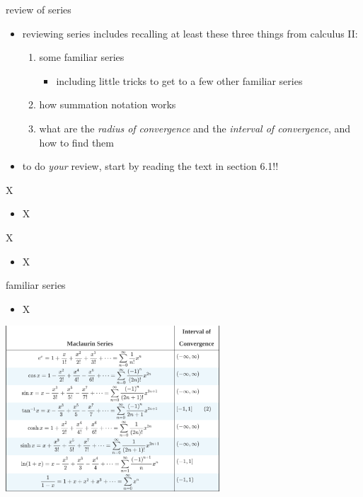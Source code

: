 \documentclass[urlcolor=blue,dvipsnames]{beamer}
\begin{document}
\begin{frame}{review of series}

\begin{itemize}
\item reviewing series includes recalling at least these three things from calculus II:
    \begin{enumerate}
    \item some familiar series
        \begin{itemize}
        \item including little tricks to get to a few other familiar series
        \end{itemize}
    \item how summation notation works
    \item what are the \emph{radius of convergence} and the \emph{interval of convergence}, and how to find them
    \end{enumerate}

\bigskip
\item to do \emph{your} review, start by \alert{reading the text in section 6.1}!!
\end{itemize}
\end{frame}


\begin{frame}{X}

\begin{itemize}
\item X
\end{itemize}
\end{frame}

\begin{frame}{X}

\begin{itemize}
\item X
\end{itemize}
\end{frame}




\begin{frame}{familiar series}

\begin{itemize}
\item X
\end{itemize}

\hfill \includegraphics[width=0.6\textwidth]{figs/familiarseries}
\end{frame}
\end{document}
